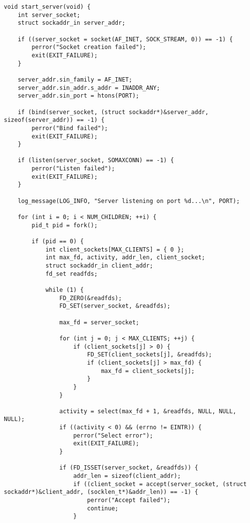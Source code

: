 \documentclass{bmstu}
\begin{document}
\begin{lstlisting}[caption={Механизм prefork + select}, label=lst:server]
void start_server(void) {
    int server_socket;
    struct sockaddr_in server_addr;

    if ((server_socket = socket(AF_INET, SOCK_STREAM, 0)) == -1) {
        perror("Socket creation failed");
        exit(EXIT_FAILURE);
    }

    server_addr.sin_family = AF_INET;
    server_addr.sin_addr.s_addr = INADDR_ANY;
    server_addr.sin_port = htons(PORT);

    if (bind(server_socket, (struct sockaddr*)&server_addr, sizeof(server_addr)) == -1) {
        perror("Bind failed");
        exit(EXIT_FAILURE);
    }

    if (listen(server_socket, SOMAXCONN) == -1) {
        perror("Listen failed");
        exit(EXIT_FAILURE);
    }

    log_message(LOG_INFO, "Server listening on port %d...\n", PORT);

    for (int i = 0; i < NUM_CHILDREN; ++i) {
        pid_t pid = fork();

        if (pid == 0) {
            int client_sockets[MAX_CLIENTS] = { 0 };
            int max_fd, activity, addr_len, client_socket;
            struct sockaddr_in client_addr;
            fd_set readfds;

            while (1) {
                FD_ZERO(&readfds);
                FD_SET(server_socket, &readfds);

                max_fd = server_socket;

                for (int j = 0; j < MAX_CLIENTS; ++j) {
                    if (client_sockets[j] > 0) {
                        FD_SET(client_sockets[j], &readfds);
                        if (client_sockets[j] > max_fd) {
                            max_fd = client_sockets[j];
                        }
                    }
                }

                activity = select(max_fd + 1, &readfds, NULL, NULL, NULL); 
                if ((activity < 0) && (errno != EINTR)) {
                    perror("Select error");
                    exit(EXIT_FAILURE);
                }

                if (FD_ISSET(server_socket, &readfds)) {
                    addr_len = sizeof(client_addr);
                    if ((client_socket = accept(server_socket, (struct sockaddr*)&client_addr, (socklen_t*)&addr_len)) == -1) {
                        perror("Accept failed");
                        continue;
                    }


\end{lstlisting}
\end{document}
